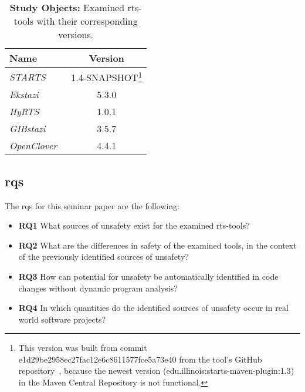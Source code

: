 \begin{savenotes}
    \begin{table}[H]
        \caption{\textbf{Study Objects:} Examined \ac{rts}-tools with their corresponding versions.}\label{table:rts-tools}
        \centering
        \begin{tabular}{l | c}
            \hline
            Name                                     & Version                                                  \\
            \hline
            \emph{STARTS}~\cite{starts_tool}         & 1.4-SNAPSHOT\footnote{This version was built from commit
                e1d29be2958ec27fac12e6c8611577fce5a73e40 from the tool's GitHub repository~\cite{starts_tool},
                because the newest version (edu.illinois:starts-maven-plugin:1.3) in the Maven Central Repository is
            not functional.}                                                                                    \\
            \emph{Ekstazi}~\cite{ekstazi_tool}       & 5.3.0                                                    \\
            \emph{HyRTS}~\cite{hyrts_tool}           & 1.0.1                                                    \\
            \emph{GIBstazi}~\cite{gibstazi_tool}     & 3.5.7                                                    \\
            \emph{OpenClover}~\cite{openclover_tool} & 4.4.1                                                    \\
            \hline
        \end{tabular}
    \end{table}
\end{savenotes}


\subsection{\acp{rq}}
The \acp{rq} for this seminar paper are the following:
\begin{itemize}
    \item \textbf{RQ1} What sources of unsafety exist for the examined \ac{rts}-tools?

    \item \textbf{RQ2} What are the differences in safety of the examined tools, in the context of the previously
          identified sources of unsafety?

    \item \textbf{RQ3} How can potential for unsafety be automatically identified in code changes
          without dynamic program analysis?

    \item \textbf{RQ4} In which quantities do the identified sources of unsafety occur in real world software projects?
\end{itemize}

